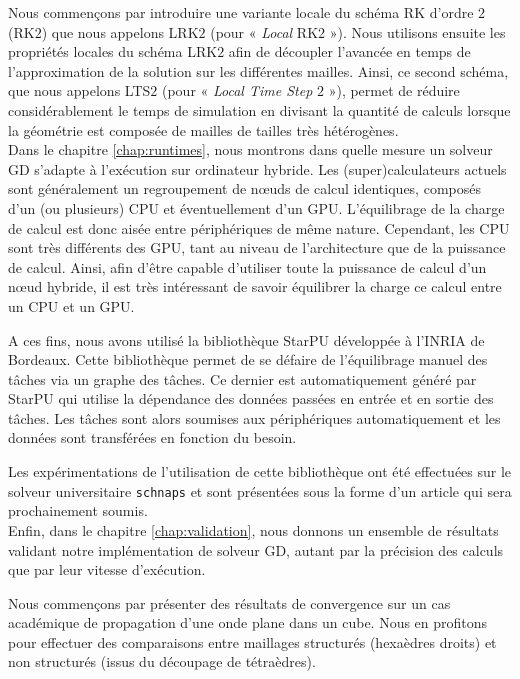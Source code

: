 Nous commençons par introduire une variante locale du schéma
RK d'ordre $2$ (RK$2$) que nous appelons LRK$2$ (pour « \textit{Local} RK$2$ »).
Nous utilisons ensuite les propriétés locales du schéma LRK$2$ afin
de découpler l'avancée en temps de l'approximation de la solution sur
les différentes mailles. Ainsi, ce second schéma, que nous appelons
LTS$2$ (pour « \textit{Local Time Step} $2$ »), permet de réduire
considérablement le temps de simulation en divisant la quantité
de calculs lorsque la géométrie est composée de mailles de tailles très hétérogènes.
\\



Dans le chapitre \ref{chap:runtimes}, nous montrons dans quelle
mesure un solveur GD s'adapte à l'exécution sur ordinateur hybride.
Les (super)calculateurs actuels sont généralement un regroupement
de nœuds de calcul identiques, composés d'un (ou plusieurs) CPU et éventuellement d'un GPU.
L'équilibrage de la charge de calcul est donc aisée
entre périphériques de même nature.
Cependant, les CPU sont très différents
des GPU, tant au niveau de l'architecture que de la puissance de calcul.
Ainsi, afin d'être capable d'utiliser toute la puissance de calcul
d'un nœud hybride, il est très intéressant
de savoir équilibrer la charge ce calcul entre un CPU et un GPU.

A ces fins, nous avons utilisé la bibliothèque StarPU
développée à l'INRIA de Bordeaux.
Cette bibliothèque permet de se défaire de l'équilibrage manuel
des tâches via un graphe des tâches. Ce dernier est automatiquement
généré par StarPU qui utilise la dépendance des données
passées en entrée et en sortie des tâches.
Les tâches sont alors soumises aux périphériques automatiquement
et les données sont transférées en fonction du besoin.

Les expérimentations de l'utilisation de cette bibliothèque ont été
effectuées sur le solveur universitaire \texttt{schnaps}
et sont présentées sous la forme
d'un article qui sera prochainement soumis.
\\




Enfin, dans le chapitre \ref{chap:validation}, nous donnons
un ensemble de résultats validant notre implémentation de solveur GD,
autant par la précision des calculs que par leur vitesse d'exécution.

Nous commençons par présenter des résultats de convergence
sur un cas académique de propagation d'une onde plane dans un cube.
Nous en profitons pour effectuer des comparaisons entre maillages
structurés (hexaèdres droits) et non structurés (issus du découpage de
tétraèdres).

